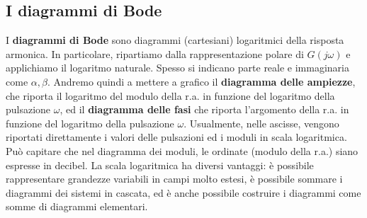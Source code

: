 \documentclass[11pt]{article}
\begin{document}
\subsection{I diagrammi di Bode}
I \textbf{diagrammi di Bode} sono diagrammi (cartesiani) logaritmici della risposta armonica. In particolare, ripartiamo dalla rappresentazione polare di $G(j\omega)$ e applichiamo il logaritmo naturale. Spesso si indicano parte reale e immaginaria come $\alpha, \beta$. Andremo quindi a mettere a grafico il \textbf{diagramma delle ampiezze}, che riporta il logaritmo del modulo della r.a. in funzione del logaritmo della pulsazione $\omega$, ed il \textbf{diagramma delle fasi} che riporta l'argomento della r.a. in funzione del logaritmo della pulsazione $\omega$.
Usualmente, nelle ascisse, vengono riportati direttamente i valori delle pulsazioni ed i moduli in scala logaritmica. Può capitare che nel diagramma dei moduli, le ordinate (modulo della r.a.) siano espresse in decibel. La scala logaritmica ha diversi vantaggi: è possibile rappresentare grandezze variabili in campi molto estesi, è possibile sommare i diagrammi dei sistemi in cascata, ed è anche possibile costruire i diagrammi come somme di diagrammi elementari.
\end{document}
